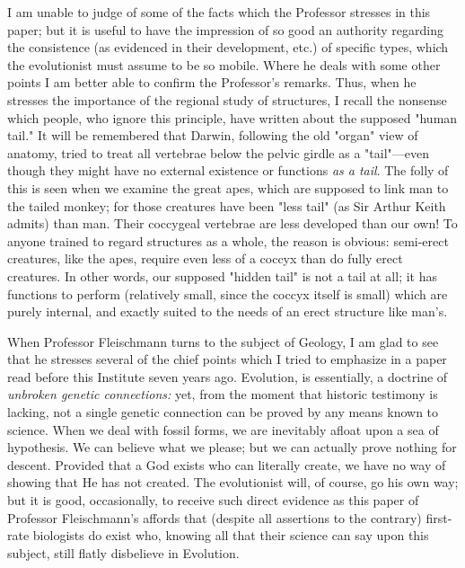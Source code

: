 I am unable to judge of some of the facts which the Professor stresses in this paper; but it is
useful to have the impression of so good an authority regarding the consistence (as evidenced
in their development, etc.) of specific types, which the evolutionist must assume to be so
mobile. Where he deals with some other points I am better able to confirm the Professor's
remarks. Thus, when he stresses the importance of the regional study of structures, I recall
the nonsense which people, who ignore this principle, have written about the supposed
"human tail." It will be remembered that Darwin, following the old "organ" view of anatomy,
tried to treat all vertebrae below the pelvic girdle as a "tail"—even though they might have
no external existence or functions \textit{as a tail}. The folly of this is seen when we examine the
great apes, which are supposed to link man to the tailed monkey; for those creatures have
been "less tail" (as Sir Arthur Keith admits) than man. Their coccygeal vertebrae are less
developed than our own! To anyone trained to regard structures as a whole, the reason is
obvious: semi-erect creatures, like the apes, require even less of a coccyx than do fully erect
creatures. In other words, our supposed "hidden tail" is not a tail at all; it has functions to
perform (relatively small, since the coccyx itself is small) which are purely internal, and
exactly suited to the needs of an erect structure like man's.

When Professor Fleischmann turns to the subject of Geology, I am glad to see that he stresses
several of the chief points which I tried to emphasize in a paper read before this Institute
seven years ago. Evolution, is essentially, a doctrine of \textit{unbroken genetic connections:} yet,
from the moment that historic testimony is lacking, not a single genetic connection can be
proved by any means known to science. When we deal with fossil forms, we are inevitably
afloat upon a sea of hypothesis. We can believe what we please; but we can actually prove
nothing for descent. Provided that a God exists who can literally create, we have no way of
showing that He has not created. The evolutionist will, of course, go his own way; but it is
good, occasionally, to receive such direct evidence as this paper of Professor Fleischmann's
affords that (despite all assertions to the contrary) first-rate biologists do exist who, knowing
all that their science can say upon this subject, still flatly disbelieve in Evolution.

